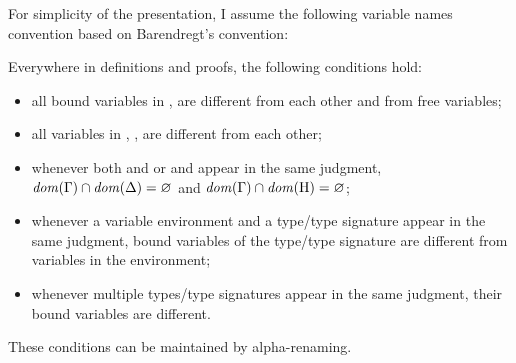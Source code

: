 For simplicity of the presentation, I assume the following variable names 
convention based on Barendregt's convention:

\begin{definition}\label{def:var-names}
    Everywhere in definitions and proofs, the following conditions hold:
    \begin{itemize}
        \item all bound variables in \ty, \tysig are different from each other 
            and from free variables;
        \item all variables in \AEnv, \UEnv, \UEnvD are different 
            from each other;
        \item whenever both \AEnv and \UEnv or \AEnv and \UEnvD
            appear in the same judgment, 
            $\operatorname{\mathit{dom}}(\Gamma) \cap \operatorname{\mathit{dom}}(\Delta) = \varnothing$ and
                $\operatorname{\mathit{dom}}(\Gamma) \cap \operatorname{\mathit{dom}}(\mathrm{H}) = \varnothing$;
        \item whenever a variable environment and a type/type signature
            appear in the same judgment, bound variables of the type/type
            signature are different from variables in the environment;
        \item whenever multiple types/type signatures appear in the same
            judgment, their bound variables are different.
    \end{itemize}
    These conditions can be maintained by alpha-renaming.
\end{definition}


